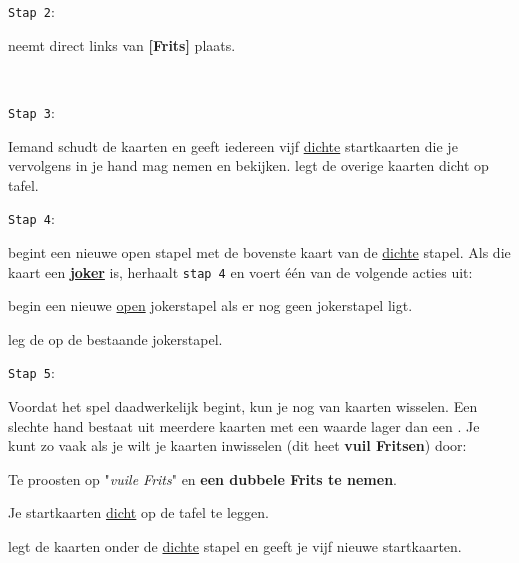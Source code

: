 \noindent
\begin{minipage}[t]{.09\textwidth}
\texttt{Stap 2}:
\end{minipage}
\hfill
\begin{minipage}[t]{.91\textwidth}
\Willem neemt direct links van \textbf{[Frits]} plaats. 
\end{minipage}
\\

\noindent
\begin{minipage}[t]{.09\textwidth}
\texttt{Stap 3}:
\end{minipage}
\hfill
\begin{minipage}[t]{.91\textwidth}
Iemand schudt de kaarten en \Frits geeft iedereen vijf \ul{dichte} startkaarten die je vervolgens in je hand mag nemen en bekijken. \Frits legt de overige kaarten dicht op tafel. \\
\end{minipage}

\noindent
\begin{minipage}[t]{.09\textwidth}
\texttt{Stap 4}:
\end{minipage}
\hfill
\begin{minipage}[t]{.91\textwidth}
\Frits begint een nieuwe open stapel met de bovenste kaart van de \ul{dichte} stapel. Als die kaart een \textbf{\ul{joker}} is, herhaalt \Frits \texttt{stap 4} en voert \'e\'en van de volgende acties uit:
\puntLijst{}
    \item begin een nieuwe \ul{open} jokerstapel als er nog geen jokerstapel ligt.
    \item leg de  op de bestaande jokerstapel.
\eindPuntLijst{}
\end{minipage}

\vspace*{+0.35cm} 

\noindent
\begin{minipage}[t]{.09\textwidth}
\texttt{Stap 5}:
\end{minipage}
\hfill
\begin{minipage}[t]{.91\textwidth}
Voordat het spel daadwerkelijk begint, kun je nog van kaarten wisselen. Een slechte hand bestaat uit meerdere kaarten met een waarde lager dan een . Je kunt zo vaak als je wilt je kaarten inwisselen (dit heet \textbf{vuil Fritsen}) door:
\numeriekeLijst{}
    \item Te proosten op "\textit{vuile Frits}" en \textbf{een dubbele Frits te nemen}.
    \item Je startkaarten \ul{dicht} op de tafel te leggen.
    \item \Frits legt de kaarten onder de \ul{dichte} stapel en geeft je vijf nieuwe startkaarten.
\eindNumeriekeLijst{}
\end{minipage}
\vspace*{+0.3cm} 
    
